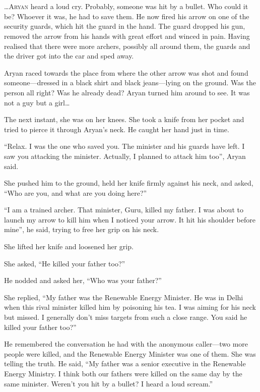 \chapter{}

\lettrine{…}{Aryan} heard a loud cry. Probably, someone was hit by a bullet. Who could it
be? Whoever it was, he had to save them. He now fired his arrow on one of the
security guards, which hit the guard in the hand. The guard dropped his gun, removed
the arrow from his hands with great effort and winced in pain. Having realised
that there were more archers, possibly all around them, the guards and the
driver got into the car and sped away.

Aryan raced towards the place from where the other arrow was shot and found
someone—dressed in a black shirt and black jeans—lying on the ground. Was
the person all right? Was he already dead? Aryan turned him around to see. It
was not a guy but a girl…

The next instant, she was on her knees. She took a knife from her pocket and
tried to pierce it through Aryan's neck. He caught her hand just in time.

“Relax. I was the one who saved you. The minister and his guards have left. I
saw you attacking the minister. Actually, I planned to attack him too”, Aryan
said.

She pushed him to the ground, held her knife firmly against his neck, and asked,
“Who are you, and what are you doing here?”

“I am a trained archer. That minister, Guru, killed my father. I was about to
launch my arrow to kill him when I noticed your arrow. It hit his shoulder before
mine”, he said, trying to free her grip on his neck.

She lifted her knife and loosened her grip.

She asked, “He killed your father too?”

He nodded and asked her, “Who was your father?”

She replied, “My father was the Renewable Energy Minister. He was in
Delhi when this rival minister killed him by poisoning his tea. I was aiming for
his neck but missed. I generally don't miss targets from such a close range.
You said he killed your father too?”

He remembered the conversation he had with the anonymous caller—two more people
were killed, and the Renewable Energy
Minister was one of them. She was telling the truth. He said, “My father was a
senior executive in the Renewable Energy Ministry. I think both our fathers
were killed on the same day by the same minister. Weren't you hit by a bullet? I
heard a loud scream.”


